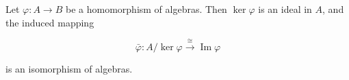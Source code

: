 Let $\varphi: A \to B$ be a homomorphism of algebras. Then $\ker \varphi$ is an ideal in $A$, and the induced mapping

$$\bar{\varphi} : A/\ker \varphi \xrightarrow{\cong} \operatorname{Im} \varphi$$

is an isomorphism of algebras.
